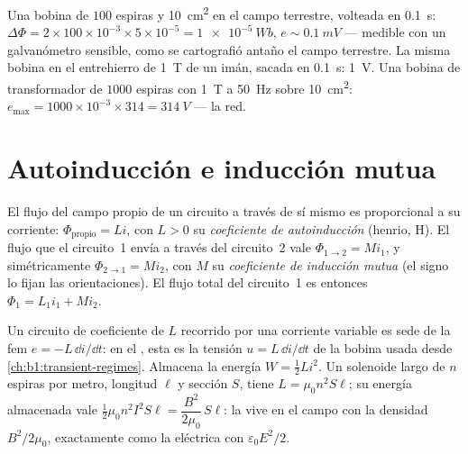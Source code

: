 \begin{example}\label{ex:b1:induction:orders}
Una bobina de $100$ espiras y \qty{10}{cm^2} en el campo terrestre, volteada en
\qty{0.1}{s}: $\Delta\Phi = 2 \times 100 \times 10^{-3} \times 5 \times 10^{-5} = \qty{1e-5}{Wb}$,
$e \sim \qty{0.1}{mV}$ --- medible con un galvanómetro sensible, como se
cartografió antaño el campo terrestre. La misma bobina en el entrehierro
de \qty{1}{T} de un imán, sacada en \qty{0.1}{s}: \qty{1}{V}. Una bobina de
transformador de $1000$ espiras con \qty{1}{T} a \qty{50}{Hz} sobre \qty{10}{cm^2}: $e_{\max} =
1000 \times 10^{-3} \times 314 = \qty{314}{V}$ --- la red.
\end{example}

\section{Autoinducción e inducción mutua}

\begin{definition}\label{def:b1:induction:inductance}
El flujo del campo propio de un circuito a través de sí mismo es
proporcional a su corriente: $\Phi_{\text{propio}} = Li$, con $L > 0$ su
\emph{coeficiente de autoinducción} (henrio, \unit{H}). El flujo que el
circuito~1 envía a través del circuito~2 vale
$\Phi_{1 \to 2} = Mi_1$, y simétricamente $\Phi_{2 \to 1} = Mi_2$, con $M$
su \emph{coeficiente de inducción mutua} (el signo lo fijan las
orientaciones). El flujo total del circuito~1 es entonces $\Phi_1 = L_1i_1 + Mi_2$.
\end{definition}

\begin{proposition}\label{prop:b1:induction:inductor}
Un circuito de coeficiente de  $L$ recorrido por una
corriente variable es sede de la fem $e = -L\,\dd i/\dd t$: en el , esta es la tensión $u = L\,\dd i/\dd t$ de la bobina usada desde
\cref{ch:b1:transient-regimes}. Almacena la energía $W = \tfrac12Li^2$.
Un solenoide largo de $n$ espiras por metro, longitud $\ell$ y sección
$S$, tiene $L = \mu_0n^2S\ell$; su energía almacenada vale $\tfrac12\mu_0n^2I^2S\ell =
\dfrac{B^2}{2\mu_0}\,S\ell$: la  vive en el campo con la
densidad $B^2/2\mu_0$, exactamente como la eléctrica con $\varepsilon_0E^2/2$.
\end{proposition}

